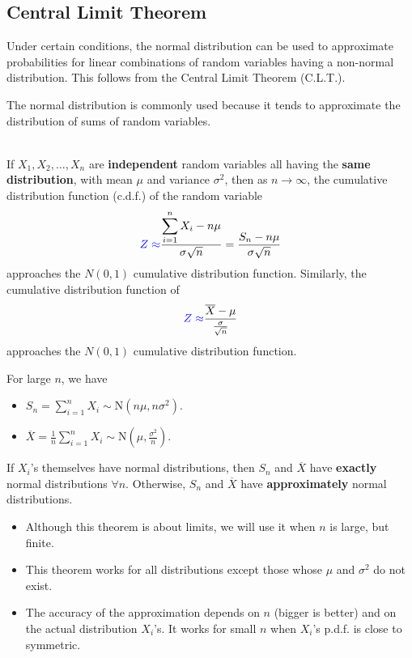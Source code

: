 \subsection{Central Limit Theorem}


Under certain conditions, the normal distribution can be used to approximate probabilities for linear combinations of random variables having a non-normal distribution. This follows from the Central Limit Theorem (C.L.T.). 

The normal distribution is commonly used because it tends to approximate the distribution of sums of random variables.


\begin{theorem}
    \phantom{}  \\
    If $X_1, X_2, \ldots, X_n$ are \textbf{independent} random variables all having the \textbf{same distribution},
    with mean $\mu$ and variance $\sigma^2$, then as $n \to \infty$, the cumulative distribution
    function (c.d.f.) of the random variable
    \[{\color{blue} Z \approx} \frac{\displaystyle \sum_{i=1}^n X_i - n\mu}{\sigma \sqrt{n}} = \frac{S_n - n\mu}{\sigma \sqrt{n}}\]
    approaches the $N(0, 1)$ cumulative distribution function. Similarly, the cumulative distribution
    function of 
    \[{\color{blue} Z \approx} \frac{\overline{X} - \mu}{\frac{\sigma}{\sqrt{n}}}\]
    approaches the $N(0, 1)$ cumulative distribution function.
\end{theorem}

\begin{remark}
    For large $n$, we have
    \begin{itemize}
        \item $S_n = \displaystyle \sum_{i=1}^{n} X_i \sim \text{N}(n\mu, n\sigma^2)$.
        \item $\overline{X} = \frac{1}{n} \displaystyle \sum_{i=1}^{n} X_i \sim \text{N}(\mu, \frac{\sigma^2}{n})$.
    \end{itemize}
    If $X_i$'s themselves have normal distributions, then $S_n$ and $\overline{X}$ have \textbf{exactly} normal distributions $\forall n$. Otherwise, $S_n$ and $\overline{X}$ have \textbf{approximately} normal distributions.
\end{remark}

\pagebreak

\begin{note}
    \phantom{}
    \begin{itemize}
        \item Although this theorem is about limits, we will use it when $n$ is large, but finite.
        \item This theorem works for all distributions except those whose $\mu$ and $\sigma^2$ do not exist.
        \item The accuracy of the approximation depends on $n$ (bigger is better) and on the actual distribution $X_i$'s. It works for small $n$ when $X_i$'s p.d.f. is close to symmetric.
    \end{itemize}
\end{note}

